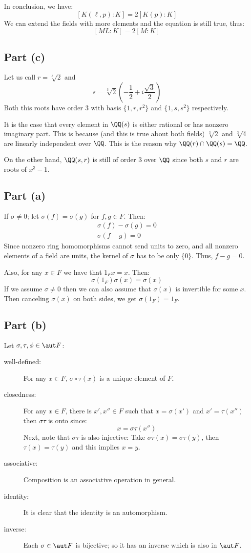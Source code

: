 In conclusion, we have:
$$[K(\ell, p):K] = 2[K(p):K]$$
We can extend the fields with  more elements and the equation is still true, thus:
$$[ML:K] = 2[M:K]$$

\subsection*{Part (c)}
Let us call $r=\sqrt[3] 2$ and
$$s=\sqrt[3] 2 \left( -\frac 12 + i \frac {\sqrt 3}2\right)$$
Both this roots have order 3 with basis $\{1,r,r^2\}$ and $\{1,s,s^2\}$ respectively.

It is the case that every element in $\QQ(s)$ is either rational or has nonzero imaginary part. This is because (and this is true about both fields) $\sqrt[3] 2$ and $\sqrt[3] 4$ are linearly independent over $\QQ$. This is the reason why $\QQ(r)\cap \QQ(s) =\QQ$. 

On the other hand, $\QQ(s,r)$ is still of order 3 over $\QQ$ since both $s$ and $r$  are roots of $x^3-1$.

\subsection*{Part (a)}
If $\sigma \neq 0$; let $\sigma(f) = \sigma(g)$ for $f,g\in F$. Then:
\begin{gather*}
    \sigma(f)- \sigma(g)=0\\
    \sigma(f-g)=0
\end{gather*}
Since nonzero ring homomorphisms cannot send units to zero, and all nonzero elements of a field are units, the kernel of $\sigma$ has to be only $\{0\}$. Thus, $f-g=0$.

Also, for any $x\in F$ we have that $1_Fx=x$. Then:
$$\sigma(1_F)\sigma(x) = \sigma(x)$$
If we assume $\sigma\neq 0$ then we can also assume that $\sigma(x)$ is invertible for some $x$. Then canceling $\sigma(x)$ on both sides, we get $\sigma(1_F)= 1_F$.

\subsection*{Part (b)}
Let $\sigma,\tau,\phi\in \aut F$:
\begin{description}
    \item[well-defined:] For any $x\in F$,  $\sigma\circ \tau(x)$ is a unique element of $F$.
    \item[closedness:] For any $x\in F$, there is $x',x''\in F$ such that $x=\sigma(x')$ and $x'=\tau(x'')$ then $\sigma\tau$ is onto since:
        $$x=\sigma\tau(x'')$$
        Next, note that $\sigma\tau$ is also injective: Take $\sigma\tau(x)=\sigma\tau(y)$, then $\tau(x)= \tau(y)$ and this implies $x=y$.
    \item[associative:] Composition is an associative operation in general.
    \item[identity:] It is clear that the identity is an automorphism.
    \item[inverse:] Each $\sigma\in \aut F$ is bijective; so it has an inverse which is also in $\aut F$.
\end{description}

